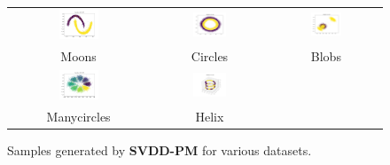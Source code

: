 \documentclass[11pt]{article}
\begin{document}
\begin{figure}[H]
    \centering
    \begin{tabular}{ccc}
        \includegraphics[width=0.3\textwidth]{exps/ddpm_2_150_0.0001_0.02_moons/samples_svdd_150.png} &
        \includegraphics[width=0.3\textwidth]{exps/ddpm_2_150_0.0001_0.02_circles/samples_svdd_150.png} &
        \includegraphics[width=0.3\textwidth]{exps/ddpm_2_150_0.0001_0.02_blobs/samples_svdd_150.png} \\
        Moons & Circles & Blobs \\[0.5em]
        
        
        \includegraphics[width=0.3\textwidth]{exps/ddpm_2_150_0.0001_0.02_manycircles/samples_svdd_150.png} &
        \includegraphics[width=0.3\textwidth]{exps/ddpm_3_150_0.0001_0.02_helix/samples_svdd_150.png} & \\
        Manycircles & Helix & \\
    \end{tabular}
    \caption{Samples generated by \textbf{SVDD-PM} for various datasets.}
    \label{fig:svdd_all_data}
\end{figure}
\end{document}
